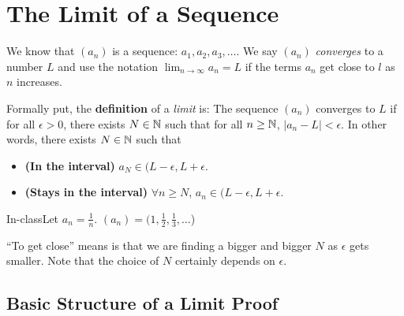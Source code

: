 \section{The Limit of a Sequence}

We know that $(a_n)$ is a sequence: $a_1,a_2,a_3,\dots$. We say $(a_n)$ \textit{converges} to a number $L$ and use the notation $\displaystyle \lim_{n \rightarrow \infty} a_n = L$ if the terms $a_n$ get close to $l$ as $n$ increases.

Formally put, the \textbf{definition} of a \textit{limit} is: The sequence $(a_n)$ converges to $L$ if for all $\epsilon > 0$, there exists $N \in \mathbb{N}$ such that for all $n \geq \mathbb{N}$, $|a_n - L| < \epsilon$. In other words, there exists $N \in \mathbb{N}$ such that 
\begin{itemize}
    \item \textbf{(In the interval)} $a_N \in (L - \epsilon, L + \epsilon$.
    \item \textbf{(Stays in the interval)} $\forall n \geq N$, $a_n \in (L - \epsilon, L + \epsilon$.
\end{itemize}

\begin{example}
    {In-class}Let $a_n = \frac{1}{n}$. $(a_n) = (1,\frac{1}{2},\frac{1}{3},\dots$)
\end{example}


``To get close'' means is that we are finding a bigger and bigger $N$ as $\epsilon$ gets smaller. Note that the choice of $N$ certainly depends on $\epsilon$.

\subsection{Basic Structure of a Limit Proof}

